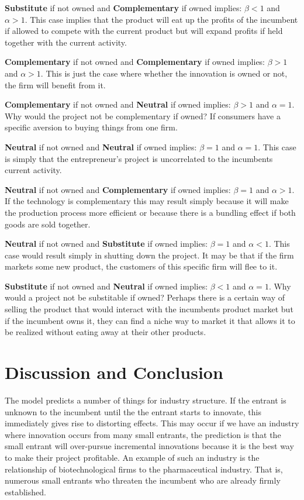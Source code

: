 \documentclass[11pt]{article}
\begin{document}
\textbf{Substitute}  if not owned and \textbf{Complementary} if owned implies: $\beta<1$ and $\alpha>1$. This case implies that the product will eat up the profits of the incumbent if allowed to compete with the current product but will expand profits if held together with the current activity. 

\textbf{Complementary} if not owned and \textbf{Complementary} if owned implies: $\beta>1$ and $\alpha>1$. This is just the case where whether the innovation is owned or not, the firm will benefit from it.

\textbf{Complementary} if not owned and \textbf{Neutral} if owned implies: $\beta>1$ and $\alpha=1$. Why would the project not be complementary if owned? If consumers have a specific aversion to buying things from one firm. 

\textbf{Neutral} if not owned and \textbf{Neutral} if owned implies: $\beta=1$ and $\alpha=1$. This case is simply that the entrepreneur's project is uncorrelated to the incumbents current activity.  

\textbf{Neutral} if not owned and \textbf{Complementary} if owned implies: $\beta=1$ and $\alpha>1$. If the technology is complementary this may result simply because it will make the production process more efficient or because there is a bundling effect if both goods are sold together. 

\textbf{Neutral} if not owned and \textbf{Substitute} if owned implies: $\beta=1$ and $\alpha<1$. This case would result simply in shutting down the project. It may be that if the firm markets some new product, the customers of this specific firm will flee to it. 

\textbf{Substitute} if not owned and \textbf{Neutral} if owned implies: $\beta<1$ and $\alpha=1$. Why would a project not be substitable if owned? Perhaps there is a certain way of selling the product that would interact with the incumbents product market but if the incumbent owns it, they can find a niche way to market it that allows it to be realized without eating away at their other products.

\section*{Discussion and Conclusion}

The model predicts a number of things for industry structure. If the entrant is unknown to the incumbent until the the entrant starts to innovate, this immediately gives rise to distorting effects.  This may occur if we have an industry where innovation occurs from many small entrants, the prediction is that the small entrant will over-pursue incremental innovations because it is the best way to make their project profitable. An example of such an industry is the relationship of biotechnological firms to the pharmaceutical industry. That is, numerous small entrants who threaten the incumbent who are already firmly established. 
\end{document}

